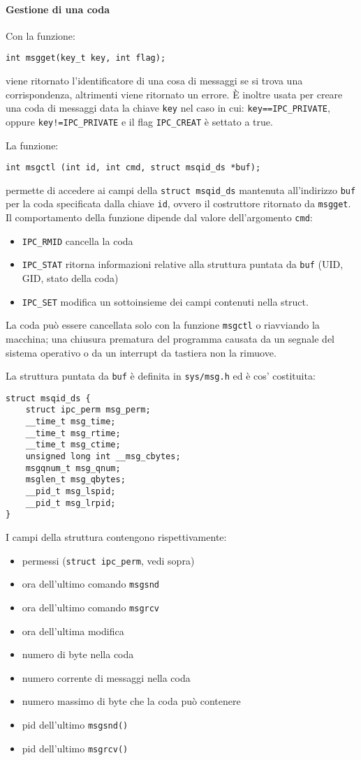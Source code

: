 \documentclass[a4paper, 10pt]{article}
\begin{document}
\paragraph{Gestione di una coda}
Con la funzione:
\begin{verbatim}
int msgget(key_t key, int flag);
\end{verbatim}
viene ritornato l'identificatore di una cosa di messaggi se si trova una corrispondenza, altrimenti viene ritornato un errore.
È inoltre usata per creare una coda di messaggi data la chiave \verb|key| nel caso in cui:
\verb|key==IPC_PRIVATE|, oppure \verb|key!=IPC_PRIVATE| e il flag  \verb|IPC_CREAT| è settato a true.

La funzione:
\begin{verbatim}
int msgctl (int id, int cmd, struct msqid_ds *buf);
\end{verbatim}
permette di accedere ai campi della \verb|struct msqid_ds|  mantenuta all'indirizzo \verb|buf| per la coda specificata dalla chiave \verb|id|, ovvero il costruttore ritornato da \verb|msgget|.
Il comportamento della funzione dipende dal valore dell'argomento \verb|cmd|:
\begin{itemize}
\item \verb|IPC_RMID| cancella la coda
\item \verb|IPC_STAT| ritorna informazioni relative alla struttura puntata da \verb|buf| (UID, GID, stato della coda)
\item \verb|IPC_SET| modifica un sottoinsieme dei campi contenuti nella struct.
\end{itemize}
La coda può essere cancellata solo con la funzione \verb|msgctl| o riavviando la macchina; una chiusura prematura del programma causata da un segnale del sistema operativo o da un interrupt da tastiera non la rimuove.

La struttura puntata da \verb|buf| è definita in \verb|sys/msg.h| ed è cos' costituita:
\begin{verbatim}
struct msqid_ds {
    struct ipc_perm msg_perm;
    __time_t msg_time;
    __time_t msg_rtime;
    __time_t msg_ctime;
    unsigned long int __msg_cbytes;
    msgqnum_t msg_qnum;
    msglen_t msg_qbytes;
    __pid_t msg_lspid;
    __pid_t msg_lrpid;
}
\end{verbatim}
I campi della struttura contengono rispettivamente:
\begin{itemize}
\item permessi (\verb|struct ipc_perm|, vedi sopra)
\item ora dell'ultimo comando \verb|msgsnd|
\item ora dell'ultimo comando \verb|msgrcv|
\item ora dell'ultima modifica
\item numero di byte nella coda
\item numero corrente di messaggi nella coda
\item numero massimo di byte che la coda può contenere
\item pid dell'ultimo \verb|msgsnd()|
\item pid dell'ultimo \verb|msgrcv()|
\end{itemize}
\end{document}
